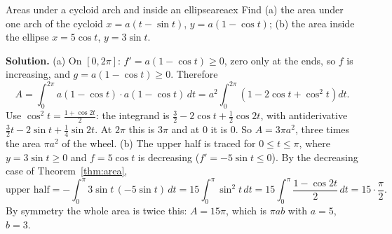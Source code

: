 \documentclass[11pt]{article}
\begin{document}
\begin{exmp}{Areas under a cycloid arch and inside an ellipse}{areaex}
Find (a) the area under one arch of the cycloid $x=a(t-\sin t)$, $y=a(1-\cos t)$; (b) the area inside the ellipse $x=5\cos t$, $y=3\sin t$.

\textbf{Solution.} (a) On $[0,2\pi]$: $f'=a(1-\cos t)\ge0$, zero only at the ends, so $f$ is increasing, and $g=a(1-\cos t)\ge0$. Therefore
\[
A=\int_0^{2\pi}a(1-\cos t)\cdot a(1-\cos t)\,dt=a^2\int_0^{2\pi}\left(1-2\cos t+\cos^2t\right)dt.
\]
Use $\cos^2t=\frac{1+\cos2t}2$: the integrand is $\frac32-2\cos t+\frac12\cos2t$, with antiderivative $\frac32t-2\sin t+\frac14\sin2t$. At $2\pi$ this is $3\pi$ and at $0$ it is $0$. So $A=3\pi a^2$, three times the area $\pi a^2$ of the wheel.
(b) The upper half is traced for $0\le t\le\pi$, where $y=3\sin t\ge0$ and $f=5\cos t$ is decreasing ($f'=-5\sin t\le0$). By the decreasing case of Theorem~\ref{thm:area},
\[
\text{upper half}=-\int_0^\pi3\sin t\,(-5\sin t)\,dt=15\int_0^\pi\sin^2t\,dt=15\int_0^\pi\frac{1-\cos2t}2\,dt=15\cdot\frac\pi2.
\]
By symmetry the whole area is twice this: $A=15\pi$, which is $\pi ab$ with $a=5$, $b=3$.
\end{exmp}

\begin{center}
\end{center}
\end{document}
